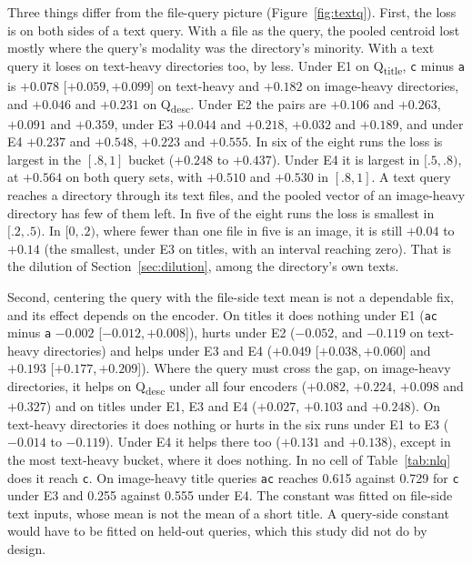 \documentclass[11pt]{article}
\newcommand{\rep}[1]{\texttt{#1}}
\newcommand{\ci}[2]{[\ensuremath{#1},\,\ensuremath{#2}]}  %
\begin{document}
Three things differ from the file-query picture (Figure~\ref{fig:textq}). First, the loss is on both sides of a text query. With a file as the query, the pooled centroid lost mostly where the query's modality was the directory's minority. With a text query it loses on text-heavy directories too, by less. Under E1 on Q\textsubscript{title}, \rep{c} minus \rep{a} is $+0.078$ \ci{+0.059}{+0.099} on text-heavy and $+0.182$ on image-heavy directories, and $+0.046$ and $+0.231$ on Q\textsubscript{desc}. Under E2 the pairs are $+0.106$ and $+0.263$, $+0.091$ and $+0.359$, under E3 $+0.044$ and $+0.218$, $+0.032$ and $+0.189$, and under E4 $+0.237$ and $+0.548$, $+0.223$ and $+0.555$. In six of the eight runs the loss is largest in the $[.8,1]$ bucket ($+0.248$ to $+0.437$). Under E4 it is largest in $[.5,.8)$, at $+0.564$ on both query sets, with $+0.510$ and $+0.530$ in $[.8,1]$. A text query reaches a directory through its text files, and the pooled vector of an image-heavy directory has few of them left. In five of the eight runs the loss is smallest in $[.2,.5)$. In $[0,.2)$, where fewer than one file in five is an image, it is still $+0.04$ to $+0.14$ (the smallest, under E3 on titles, with an interval reaching zero). That is the dilution of Section~\ref{sec:dilution}, among the directory's own texts.

Second, centering the query with the file-side text mean is not a dependable fix, and its effect depends on the encoder. On titles it does nothing under E1 (\rep{ac} minus \rep{a} $-0.002$ \ci{-0.012}{+0.008}), hurts under E2 ($-0.052$, and $-0.119$ on text-heavy directories) and helps under E3 and E4 ($+0.049$ \ci{+0.038}{+0.060} and $+0.193$ \ci{+0.177}{+0.209}). Where the query must cross the gap, on image-heavy directories, it helps on Q\textsubscript{desc} under all four encoders ($+0.082$, $+0.224$, $+0.098$ and $+0.327$) and on titles under E1, E3 and E4 ($+0.027$, $+0.103$ and $+0.248$). On text-heavy directories it does nothing or hurts in the six runs under E1 to E3 ($-0.014$ to $-0.119$). Under E4 it helps there too ($+0.131$ and $+0.138$), except in the most text-heavy bucket, where it does nothing. In no cell of Table~\ref{tab:nlq} does it reach \rep{c}. On image-heavy title queries \rep{ac} reaches 0.615 against 0.729 for \rep{c} under E3 and 0.255 against 0.555 under E4. The constant was fitted on file-side text inputs, whose mean is not the mean of a short title. A query-side constant would have to be fitted on held-out queries, which this study did not do by design.
\end{document}
